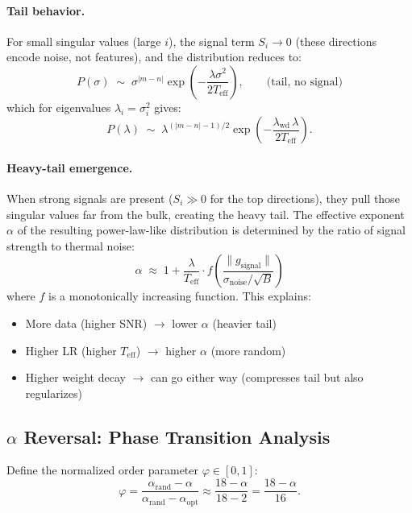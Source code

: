 \paragraph{Tail behavior.} For small singular values (large $i$), the signal term $S_i \to 0$ (these directions encode noise, not features), and the distribution reduces to:
\begin{equation}
    P(\sigma) \;\sim\; \sigma^{|m-n|} \exp\!\left(-\frac{\lambda\sigma^2}{2T_{\mathrm{eff}}}\right), \qquad \text{(tail, no signal)}
\end{equation}
which for eigenvalues $\lambda_i = \sigma_i^2$ gives:
\begin{equation}
    P(\lambda) \;\sim\; \lambda^{(|m-n|-1)/2} \exp\!\left(-\frac{\lambda_{\mathrm{wd}}\,\lambda}{2T_{\mathrm{eff}}}\right).
\end{equation}

\paragraph{Heavy-tail emergence.} When strong signals are present ($S_i \gg 0$ for the top directions), they pull those singular values far from the bulk, creating the heavy tail. The effective exponent $\alpha$ of the resulting power-law-like distribution is determined by the ratio of signal strength to thermal noise:
\begin{equation}
    \alpha \;\approx\; 1 + \frac{\lambda}{T_{\mathrm{eff}}} \cdot f\!\left(\frac{\|g_{\mathrm{signal}}\|}{\sigma_{\mathrm{noise}} / \sqrt{B}}\right)
\end{equation}
where $f$ is a monotonically increasing function. This explains:
\begin{itemize}[leftmargin=*,itemsep=0pt]
    \item More data (higher SNR) $\to$ lower $\alpha$ (heavier tail)
    \item Higher LR (higher $T_{\mathrm{eff}}$) $\to$ higher $\alpha$ (more random)
    \item Higher weight decay $\to$ can go either way (compresses tail but also regularizes)
\end{itemize}

\subsection{$\alpha$ Reversal: Phase Transition Analysis}

Define the normalized order parameter $\varphi \in [0, 1]$:
\begin{equation}
    \varphi = \frac{\alpha_{\mathrm{rand}} - \alpha}{\alpha_{\mathrm{rand}} - \alpha_{\mathrm{opt}}} \approx \frac{18 - \alpha}{18 - 2} = \frac{18 - \alpha}{16}.
\end{equation}

